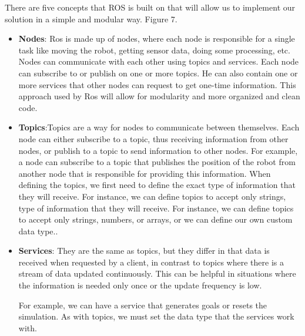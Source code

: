 \documentclass[12pt]{extarticle}
\begin{document}
There are five concepts that ROS is built on that will allow us to implement our solution in a simple and modular way. Figure 7.

 

\begin{itemize}
\item \textbf{Nodes}: Ros is made up of nodes, where each node is responsible for a single task like moving the robot, getting sensor data, doing some processing, etc. Nodes can communicate with each other using topics and services.
Each node can subscribe to or publish on one or more topics. He can also contain one or more services that other nodes can request to get one-time information. This approach used by Ros will allow for modularity and more organized and clean code.



\item \textbf{Topics}:Topics are a way for nodes to communicate between themselves. Each node can either subscribe to a topic, thus receiving information from other nodes, or publish to a topic to send information to other nodes.
For example, a node can subscribe to a topic that publishes the position of the robot from another node that is responsible for providing this information.
When defining the topics, we first need to define the exact type of information that they will receive. For instance, we can define topics to accept only strings,  type of information that they will receive. For instance, we can define topics to accept only strings, numbers, or arrays, or we can define our own custom data type..


\item \textbf{Services}:  They are the same as topics, but they differ in that data is received when requested by a client, in contrast to topics where there is a stream of data updated continuously. This can be helpful in situations where the information is needed only once or the update frequency is low.

For example, we can have a service that generates goals or resets the simulation.
As with topics, we must set the data type that the services work with.

\end{itemize}
 
\end{document}
